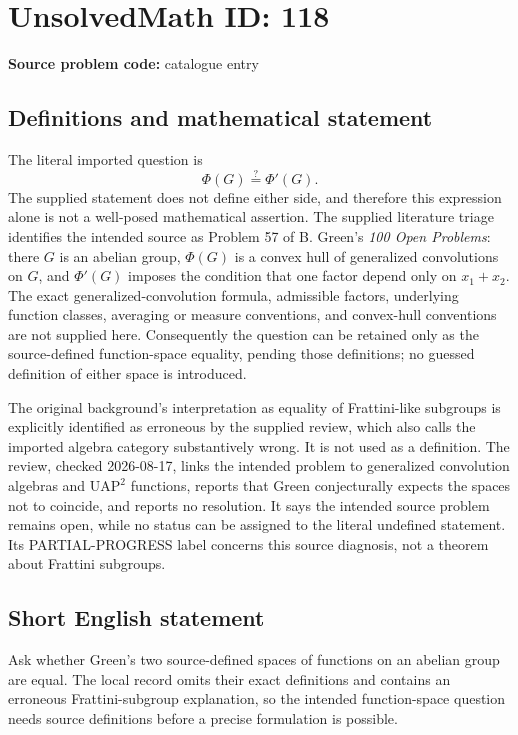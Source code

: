 \documentclass[11pt]{article}
\begin{document}
\section*{UnsolvedMath ID: 118}
\textbf{Source problem code:} catalogue entry
\subsection{Definitions and mathematical statement}
The literal imported question is
\[\Phi(G)\stackrel{?}{=}\Phi'(G).\]
The supplied statement does not define either side, and therefore this expression alone is not a well-posed mathematical assertion. The supplied literature triage identifies the intended source as Problem 57 of B. Green's \emph{100 Open Problems}: there $G$ is an abelian group, $\Phi(G)$ is a convex hull of generalized convolutions on $G$, and $\Phi'(G)$ imposes the condition that one factor depend only on $x_1+x_2$. The exact generalized-convolution formula, admissible factors, underlying function classes, averaging or measure conventions, and convex-hull conventions are not supplied here. Consequently the question can be retained only as the source-defined function-space equality, pending those definitions; no guessed definition of either space is introduced.

The original background's interpretation as equality of Frattini-like subgroups is explicitly identified as erroneous by the supplied review, which also calls the imported algebra category substantively wrong. It is not used as a definition. The review, checked 2026-08-17, links the intended problem to generalized convolution algebras and $\mathrm{UAP}^{2}$ functions, reports that Green conjecturally expects the spaces not to coincide, and reports no resolution. It says the intended source problem remains open, while no status can be assigned to the literal undefined statement. Its PARTIAL-PROGRESS label concerns this source diagnosis, not a theorem about Frattini subgroups.
\subsection{Short English statement}
Ask whether Green's two source-defined spaces of functions on an abelian group are equal. The local record omits their exact definitions and contains an erroneous Frattini-subgroup explanation, so the intended function-space question needs source definitions before a precise formulation is possible.
\end{document}
